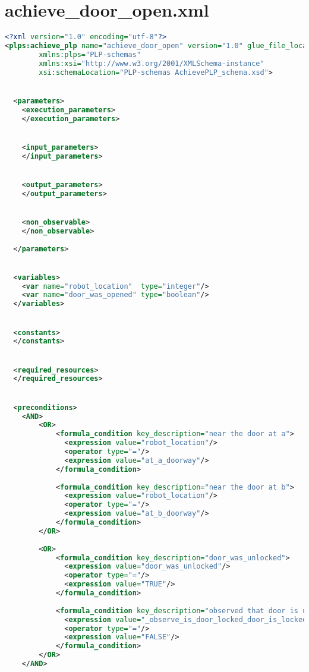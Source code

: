 \section{  achieve_door_open.xml}\label{Appendix_3_3} 
\begin{lstlisting}[style=stylexml,language=XML]
<?xml version="1.0" encoding="utf-8"?>
<plps:achieve_plp name="achieve_door_open" version="1.0" glue_file_location=""
        xmlns:plps="PLP-schemas"
        xmlns:xsi="http://www.w3.org/2001/XMLSchema-instance"
        xsi:schemaLocation="PLP-schemas AchievePLP_schema.xsd">


  <parameters>
    <execution_parameters>
    </execution_parameters>


    <input_parameters>
    </input_parameters>


    <output_parameters>
    </output_parameters>


    <non_observable>
    </non_observable>
    
  </parameters>


  <variables>
    <var name="robot_location"  type="integer"/>
    <var name="door_was_opened" type="boolean"/>
  </variables>


  <constants>
  </constants>


  <required_resources>
  </required_resources>


  <preconditions>
    <AND>
        <OR>
            <formula_condition key_description="near the door at a">
              <expression value="robot_location"/>
              <operator type="="/>
              <expression value="at_a_doorway"/>
            </formula_condition>
            
            <formula_condition key_description="near the door at b">
              <expression value="robot_location"/>
              <operator type="="/>
              <expression value="at_b_doorway"/>
            </formula_condition>
        </OR>
    
        <OR>
            <formula_condition key_description="door_was_unlocked">
              <expression value="door_was_unlocked"/>
              <operator type="="/>
              <expression value="TRUE"/>
            </formula_condition>
            
            <formula_condition key_description="observed that door is unlocked">
              <expression value="_observe_is_door_locked_door_is_locked"/>
              <operator type="="/>
              <expression value="FALSE"/>
            </formula_condition>
        </OR>
    </AND>
    

\end{lstlisting}
